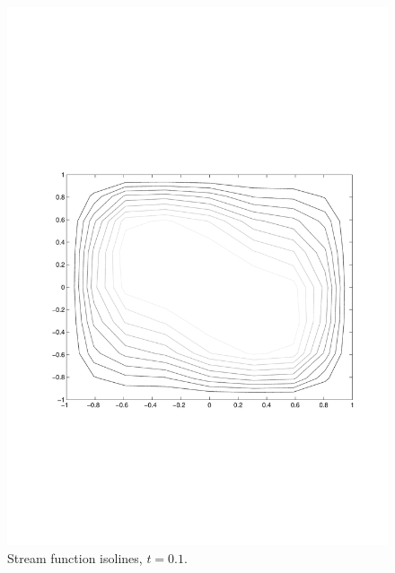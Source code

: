 \begin{multicols}{2}

\begin{figure}[H]
\centering
\includegraphics[scale=0.45, trim = 30mm 75mm 15mm 80mm, clip]{./Figures/4-IVBP/stream_t_1.pdf}
\caption{Stream function isolines, $t=0.1$.
}
\end{figure}


\columnbreak


\end{multicols}
